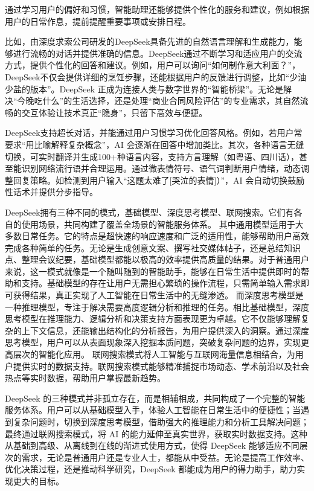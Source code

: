 通过学习用户的偏好和习惯，智能助理还能够提供个性化的服务和建议，例如根据用户的日常作息，提前提醒重要事项或安排日程。

比如，由深度求索公司研发的DeepSeek具备先进的自然语言理解和生成能力，能够进行流畅的对话并提供准确的信息。DeepSeek通过不断学习和适应用户的交流方式，提供个性化的回答和建议。例如，用户可以询问“如何制作意大利面？”，DeepSeek不仅会提供详细的烹饪步骤，还能根据用户的反馈进行调整，比如“少油少盐的版本”。DeepSeek 正成为连接人类与数字世界的“智能桥梁”。无论是解决“今晚吃什么”的生活选择，还是处理“商业合同风险评估”的专业需求，其自然流畅的交互体验让技术真正“隐身”，只留下高效与便捷。

DeepSeek支持超长对话，并能通过用户习惯学习优化回答风格。例如，若用户常要求“用比喻解释复杂概念”，AI 会逐渐在回答中增加类比。其次，各种语言无缝切换，可实时翻译并生成100+种语言内容，支持方言理解（如粤语、四川话），甚至能识别网络流行语并合理运用。通过微表情符号、语气词判断用户情绪，动态调整回复策略。如检测到用户输入“这题太难了[哭泣的表情]）”，AI 会自动切换鼓励性话术并提供分步指导。


DeepSeek拥有三种不同的模式，基础模型、深度思考模型、联网搜索。它们有各自的使用场景，共同构建了覆盖全场景的智能服务体系。
其中通用模型适用于大多数日常任务。它的特点是超快速的响应速度和广泛的适用性，能够帮助用户高效完成各种简单的任务。无论是生成创意文案、撰写社交媒体帖子，还是总结知识点、整理会议纪要，基础模型都能以极高的效率提供高质量的结果。对于普通用户来说，这一模式就像是一个随叫随到的智能助手，能够在日常生活中提供即时的帮助和支持。基础模型的存在让用户无需担心繁琐的操作流程，只需简单输入需求即可获得结果，真正实现了人工智能在日常生活中的无缝渗透。
而深度思考模型是一种推理模型，专注于解决需要高度逻辑分析和推理的任务。相比基础模型，深度思考模型在推理能力、逻辑分析和决策支持方面表现更为卓越。它不仅能够理解复杂的上下文信息，还能输出结构化的分析报告，为用户提供深入的洞察。通过深度思考模型，用户可以从表面现象深入挖掘本质问题，突破复杂问题的边界，实现更高层次的智能化应用。
联网搜索模式将人工智能与互联网海量信息相结合，为用户提供实时的数据支持。联网搜索模式能够精准捕捉市场动态、学术前沿以及社会热点等实时数据，帮助用户掌握最新趋势。

DeepSeek 的三种模式并非孤立存在，而是相辅相成，共同构成了一个完整的智能服务体系。用户可以从基础模型入手，体验人工智能在日常生活中的便捷性；当遇到复杂问题时，切换到深度思考模型，借助强大的推理能力和分析工具解决问题；最终通过联网搜索模式，将 AI 的能力延伸至真实世界，获取实时数据支持。这种从基础到高级、从离线到在线的渐进式使用方式，使得 DeepSeek 能够适应不同层次的需求，无论是普通用户还是专业人士，都能从中受益。无论是提高工作效率、优化决策过程，还是推动科学研究，DeepSeek 都能成为用户的得力助手，助力实现更大的目标。


